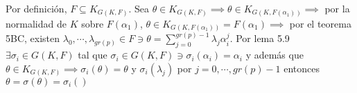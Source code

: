 \begin{teorema}[5P]
\begin{dem}
\begin{itemize}
\begin{itemize}
                Por definición, $F\subseteq K_{G(K,F)}$. Sea $\theta\in K_{G(K,F)}\implies \theta\in K_{G(K,F(\alpha_1))}\implies$ por la normalidad de $K$ sobre $F(\alpha_1)$, $\theta \in K_{G(K,F(\alpha_1))}=F(\alpha_1)\implies$ por el teorema 5BC, existen $\lambda_0,\cdots, \lambda_{gr(p)}\in F\ni \theta=\sum_{j=0}^{gr(p)-1}\lambda_j\alpha_i^j$. Por lema 5.9 $\exists \sigma_i\in G(K,F)$ tal que $\sigma_i\in G(K,F)\ni \sigma_i(\alpha_i)=\alpha_i$ y además que $\theta \in K_{G(K,F)}\implies \sigma_i(\theta)=\theta$ y $\sigma_i(\lambda_j)$ por $j=0,\cdots, gr(p)-1$ entonces $\theta=\sigma(\theta)=\sigma_i\left(\right)$ 
            \end{itemize}
        \end{itemize}
    \end{dem}
\end{teorema}